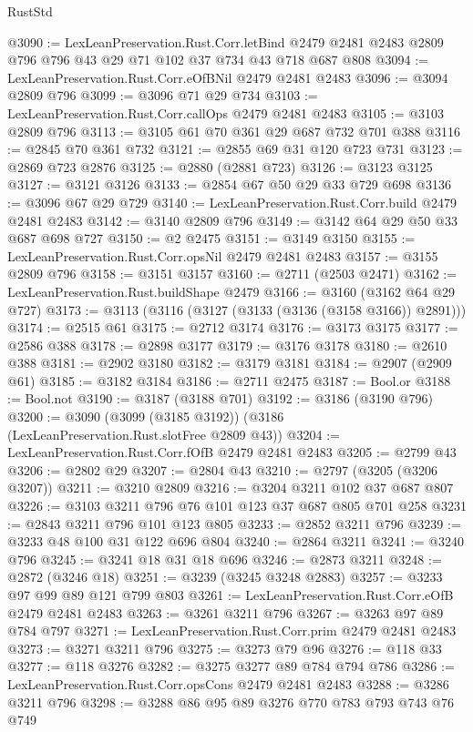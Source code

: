 \begin{lexlean}{RustStd}
\begin{coremodule}
{\begin{coremodule}
{{{{{{{{{{{{{{{{{{{{@3090 := LexLeanPreservation.Rust.Corr.letBind
    @2479
    @2481
    @2483
    @2809
    @796
    @796
    @43
    @29
    @71
    @102
    @37
    @734
    @43
    @718
    @687
    @808
@3094 := LexLeanPreservation.Rust.Corr.eOfBNil @2479 @2481 @2483
@3096 := @3094 @2809 @796
@3099 := @3096 @71 @29 @734
@3103 := LexLeanPreservation.Rust.Corr.callOps @2479 @2481 @2483
@3105 := @3103 @2809 @796
@3113 := @3105 @61 @70 @361 @29 @687 @732 @701 @388
@3116 := @2845 @70 @361 @732
@3121 := @2855 @69 @31 @120 @723 @731
@3123 := @2869 @723 @2876
@3125 := @2880 (@2881 @723)
@3126 := @3123 @3125
@3127 := @3121 @3126
@3133 := @2854 @67 @50 @29 @33 @729 @698
@3136 := @3096 @67 @29 @729
@3140 := LexLeanPreservation.Rust.Corr.build @2479 @2481 @2483
@3142 := @3140 @2809 @796
@3149 := @3142 @64 @29 @50 @33 @687 @698 @727
@3150 := @2 @2475
@3151 := @3149 @3150
@3155 := LexLeanPreservation.Rust.Corr.opsNil @2479 @2481 @2483
@3157 := @3155 @2809 @796
@3158 := @3151 @3157
@3160 := @2711 (@2503 @2471)
@3162 := LexLeanPreservation.Rust.buildShape @2479
@3166 := @3160 (@3162 @64 @29 @727)
@3173 := @3113 (@3116 (@3127 (@3133 (@3136 (@3158 @3166)) @2891)))
@3174 := @2515 @61
@3175 := @2712 @3174
@3176 := @3173 @3175
@3177 := @2586 @388
@3178 := @2898 @3177
@3179 := @3176 @3178
@3180 := @2610 @388
@3181 := @2902 @3180
@3182 := @3179 @3181
@3184 := @2907 (@2909 @61)
@3185 := @3182 @3184
@3186 := @2711 @2475
@3187 := Bool.or
@3188 := Bool.not
@3190 := @3187 (@3188 @701)
@3192 := @3186 (@3190 @796)
@3200 := @3090 (@3099 (@3185 @3192)) (@3186 (LexLeanPreservation.Rust.slotFree @2809 @43))
@3204 := LexLeanPreservation.Rust.Corr.fOfB @2479 @2481 @2483
@3205 := @2799 @43
@3206 := @2802 @29
@3207 := @2804 @43
@3210 := @2797 (@3205 (@3206 @3207))
@3211 := @3210 @2809
@3216 := @3204 @3211 @102 @37 @687 @807
@3226 := @3103 @3211 @796 @76 @101 @123 @37 @687 @805 @701 @258
@3231 := @2843 @3211 @796 @101 @123 @805
@3233 := @2852 @3211 @796
@3239 := @3233 @48 @100 @31 @122 @696 @804
@3240 := @2864 @3211
@3241 := @3240 @796
@3245 := @3241 @18 @31 @18 @696
@3246 := @2873 @3211
@3248 := @2872 (@3246 @18)
@3251 := @3239 (@3245 @3248 @2883)
@3257 := @3233 @97 @99 @89 @121 @799 @803
@3261 := LexLeanPreservation.Rust.Corr.eOfB @2479 @2481 @2483
@3263 := @3261 @3211 @796
@3267 := @3263 @97 @89 @784 @797
@3271 := LexLeanPreservation.Rust.Corr.prim @2479 @2481 @2483
@3273 := @3271 @3211 @796
@3275 := @3273 @79 @96
@3276 := @118 @33
@3277 := @118 @3276
@3282 := @3275 @3277 @89 @784 @794 @786
@3286 := LexLeanPreservation.Rust.Corr.opsCons @2479 @2481 @2483
@3288 := @3286 @3211 @796
@3298 := @3288 @86 @95 @89 @3276 @770 @783 @793 @743 @76 @749
}}}}}}}}}}}}}}}}}}}}
\end{coremodule}}
\end{coremodule}
\end{lexlean}
